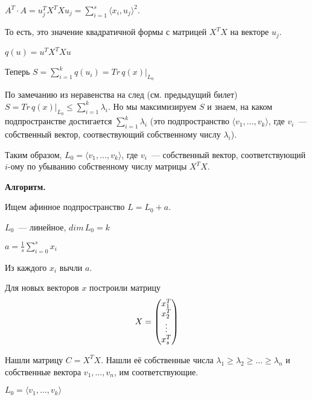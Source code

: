 $A^T\cdot A = u_j^TX^TXu_j = \sum\limits_{i = 1}^s\langle x_i, u_j\rangle^2$.

То есть, это значение квадратичной формы с матрицей $X^TX$ на векторе $u_j$.

$q(u) = u^TX^TXu$

Теперь $S = \sum\limits_{i = 1}^k q(u_i) = Tr\, q(x)|_{L_0}$

По замечанию из неравенства на след (см. предыдущий билет) $S = Tr\,q(x)|_{L_0} \le \sum\limits_{i = 1}^k \lambda_i$. Но мы максимизируем $S$ и знаем, на каком подпространстве достигается $\sum\limits_{i = 1}^k \lambda_i$ (это подпространство $\langle v_1,\ldots, v_k\rangle$, где $v_i$~--- собственный вектор, соотвествующий собственному числу $\lambda_i$).

Таким образом, $L_0 = \langle v_1,\ldots,v_k\rangle$, где $v_i$~--- собственный вектор, соответствующий $i$-ому по убыванию собственному числу матрицы $X^TX$.

{\bf Алгоритм.}

Ищем афинное подпространство $L = L_0 + a$.

$L_0$~--- линейное, $dim\,L_0 = k$

$a = \frac{1}{s}\sum\limits_{i = 0}^s x_i$

Из каждого $x_i$ вычли $a$.

Для новых векторов $x$ построили матрицу 
$$
X=\begin{pmatrix}
x_1^T\\
x_2^T\\
\vdots\\
x_s^T
\end{pmatrix}
$$

Нашли матрицу $C = X^TX$. Нашли её собственные числа $\lambda_1\ge\lambda_2\ge\ldots\ge\lambda_n$ и собственные вектора $v_1,\ldots, v_n$, им соответствующие.

$L_0 = \langle v_1,\ldots,v_k\rangle$
